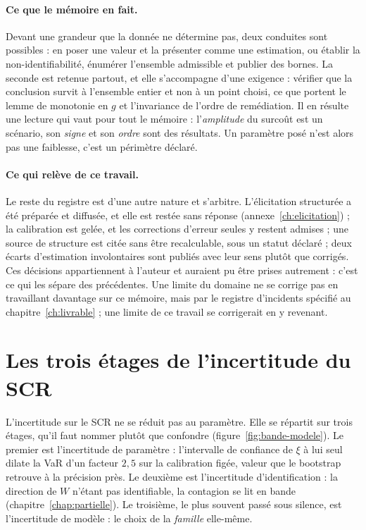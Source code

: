 \paragraph{Ce que le mémoire en fait.} Devant une grandeur que la donnée ne détermine pas, deux
conduites sont possibles : en poser une valeur et la présenter comme une estimation, ou établir
la non-identifiabilité, énumérer l'ensemble admissible et publier des bornes. La seconde est
retenue partout, et elle s'accompagne d'une exigence : vérifier que la conclusion survit à
l'ensemble entier et non à un point choisi, ce que portent le lemme de monotonie en $g$ et
l'invariance de l'ordre de remédiation. Il en résulte une lecture qui vaut pour tout le
mémoire : l'\emph{amplitude} du surcoût est un scénario, son \emph{signe} et son \emph{ordre}
sont des résultats. Un paramètre posé n'est alors pas une faiblesse, c'est un périmètre déclaré.

\paragraph{Ce qui relève de ce travail.} Le reste du registre est d'une autre nature et
s'arbitre. L'élicitation structurée a été préparée et diffusée, et elle est restée sans réponse
(annexe~\ref{ch:elicitation}) ; la calibration est gelée, et les
corrections d'erreur seules y restent admises ; une source de structure est citée sans être
recalculable, sous un statut déclaré ; deux écarts d'estimation involontaires sont publiés avec
leur sens plutôt que corrigés. Ces décisions appartiennent à l'auteur et auraient pu être prises
autrement : c'est ce qui les sépare des précédentes. Une limite du domaine ne se corrige pas en
travaillant davantage sur ce mémoire, mais par le registre d'incidents spécifié au
chapitre~\ref{ch:livrable} ; une limite de ce travail se corrigerait en y revenant.

\section{Les trois étages de l'incertitude du SCR}
\label{sec:trois-etages}

L'incertitude sur le SCR ne se réduit pas au paramètre. Elle se répartit sur trois étages, qu'il
faut nommer plutôt que confondre (figure~\ref{fig:bande-modele}). Le premier est l'incertitude
de paramètre : l'intervalle de confiance de $\xi$ à lui seul dilate la VaR d'un facteur
$2{,}5$ sur la calibration figée, valeur que le bootstrap retrouve à la précision près.
Le deuxième est l'incertitude d'identification :
la direction de $W$ n'étant pas identifiable, la contagion se lit en bande
(chapitre~\ref{chap:partielle}). Le troisième, le plus souvent passé sous silence, est
l'incertitude de modèle : le choix de la \emph{famille} elle-même.

